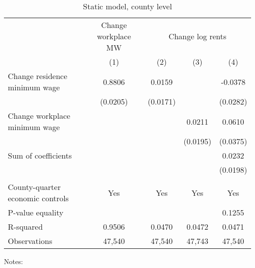 \begin{table}[hbt!] \centering
    \caption{Static model, county level}
    \label{tab:static_county}

    \begin{tabular}{l*{4}{c}}
    \toprule
                                        & \multicolumn{1}{c}{Change workplace MW}
                                        & \multicolumn{3}{c}{Change log rents}  \\ \cmidrule(lr){2-2}\cmidrule(lr){3-5}
                                              & (1)   & (2)   & (3)   & (4)      \\ \midrule
    Change residence minimum wage             &  0.8806  &  0.0159  &       &  -0.0378     \\
                                              & (0.0205) & (0.0171) &       & (0.0282)    \\
    Change workplace minimum wage             &       &       &  0.0211  & 0.0610      \\
                                              &       &       & (0.0195) & (0.0375)    \\ \midrule
    Sum of coefficients                       &       &       &       &  0.0232     \\
                                              &       &       &       & (0.0198)    \\
                                              &       &       &       &          \\ \midrule
    County-quarter economic controls          &  Yes  & Yes   & Yes   & Yes      \\
    P-value equality                          &       &       &       & 0.1255      \\
    R-squared                                 &  0.9506  &  0.0470  &  0.0472  & 0.0471      \\
    Observations                              & 47,540  & 47,540  & 47,743  & 47,540     \\\bottomrule
    \end{tabular}

    \begin{minipage}{.95\textwidth} \footnotesize
        \vspace{2mm}
        Notes: 
    \end{minipage}
\end{table}
